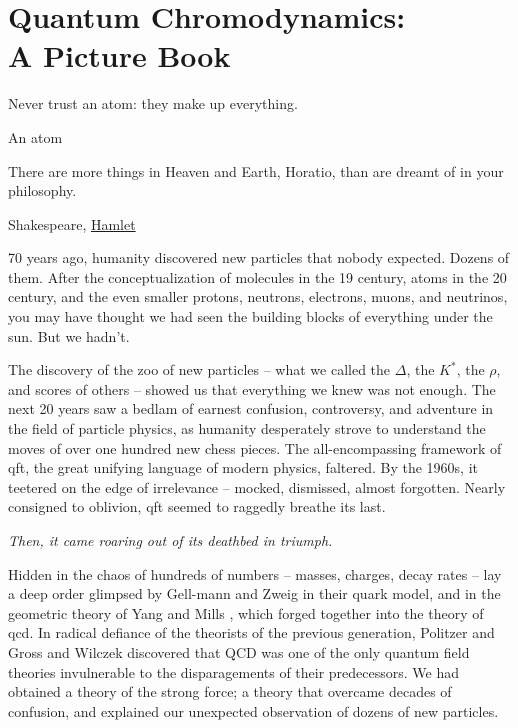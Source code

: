 \chapter[Quantum Chromodynamics (QCD): A Picture Book]{Quantum Chromodynamics:\\A Picture Book}

\label{chap:picturebook}

\epigraph{Never trust an atom: they make up everything.}{An atom}

\epigraph{There are more things in Heaven and Earth, Horatio, than are dreamt of in your philosophy.}{Shakespeare, \underline{Hamlet}}


70 years ago, humanity discovered new particles that nobody expected.
%
Dozens of them.
%
After the conceptualization of molecules in the 19\th{} century, atoms in the 20\th{} century, and the even smaller protons, neutrons, electrons, muons, and neutrinos, you may have thought we had seen the building blocks of everything under the sun.
%
But we hadn't.

The discovery of the zoo of new particles -- what we called the \(\Delta\), the \(K^*\), the \(\rho\), and scores of others -- showed us that everything we knew was not enough.
%
The next 20 years saw a bedlam of earnest confusion, controversy, and adventure in the field of particle physics, as humanity desperately strove to understand the moves of over one hundred new chess pieces.
%
The all-encompassing framework of \gls{qft}, the great unifying language of modern physics, faltered.
%
By the 1960s, it teetered on the edge of irrelevance -- mocked, dismissed, almost forgotten.
%
Nearly consigned to oblivion, \gls{qft} seemed to raggedly breathe its last.

\textit{Then, it came roaring out of its deathbed in triumph.}

Hidden in the chaos of hundreds of numbers -- masses, charges, decay rates -- lay a deep order glimpsed by Gell-mann and Zweig \cite{} in their quark model, and in the geometric theory of Yang and Mills \cite{}, which forged together into the theory of \gls{qcd}.
%
In radical defiance of the theorists of the previous generation, Politzer \cite{Politzer:1973fx} and Gross and Wilczek \cite{Gross:1973ju} discovered that QCD was one of the only quantum field theories invulnerable to the disparagements of their predecessors.
%
We had obtained a theory of the strong force;
%
a theory that overcame decades of confusion, and explained our unexpected observation of dozens of new particles.

